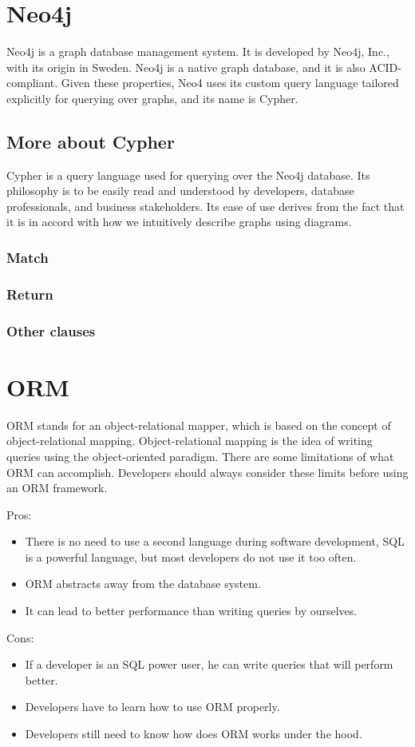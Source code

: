 \section{Neo4j}

Neo4j is a graph database management system. It is developed by Neo4j, Inc., with its origin in Sweden. Neo4j is a native graph database, and it is also ACID-compliant. Given these properties, Neo4 uses its custom query language tailored explicitly for querying over graphs, and its name is Cypher.

\subsection{More about Cypher}

Cypher is a query language used for querying over the Neo4j database. Its philosophy is to be easily read and understood by developers, database professionals, and business stakeholders. Its ease of use derives from the fact that it is in accord with how we intuitively describe graphs using diagrams. \cite{robinson_graph_2015}

\subsubsection{Match}
\subsubsection{Return}
\subsubsection{Other clauses}

\section{ORM}
ORM stands for an object-relational mapper, which is based on the concept of object-relational mapping. Object-relational mapping is the idea of writing queries using the object-oriented paradigm.
There are some limitations of what ORM can accomplish. Developers should always consider these limits before using an ORM framework. \cite{mario_hoyos_what_2018}

\noindent Pros:
\begin{itemize}
    \item There is no need to use a second language during software development, SQL is a powerful language, but most developers do not use it too often.
    \item ORM abstracts away from the database system.
    \item It can lead to better performance than writing queries by ourselves.
\end{itemize}
Cons:
\begin{itemize}
    \item If a developer is an SQL power user, he can write queries that will perform better.
    \item Developers have to learn how to use ORM properly.
    \item Developers still need to know how does ORM works under the hood.
\end{itemize}

